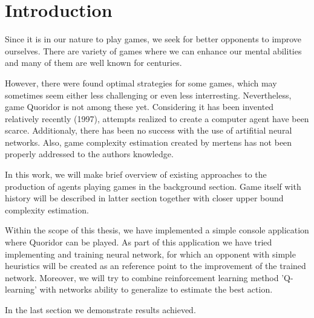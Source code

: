 \chapter{Introduction}\label{chap:1}

Since it is in our nature to play games, we seek for better opponents to
improve ourselves.
There are variety of games where we can enhance our mental abilities and many
of them are well known for centuries.

However, there were found optimal strategies for some games, which may
sometimes seem either less challenging or even less interresting.
Nevertheless, game Quoridor is not among these yet.
Considering it has been invented relatively recently (1997), attempts realized
to create a computer agent have been scarce.
Additionaly, there has been no success with the use of artifitial neural
networks.  Also, game complexity estimation created by mertens has not been
properly addressed to the authors knowledge.

In this work, we will make brief overview of existing approaches to the
production of agents playing games in the background section.
Game itself with history will be described in latter section together with
closer upper bound complexity estimation.

Within the scope of this thesis, we have implemented a simple
console application where Quoridor can be played.
As part of this application we have tried implementing and training neural
network, for which an opponent with simple heuristics will be created as
an reference point to the improvement of the trained network.
Moreover, we will try to combine reinforcement learning method 'Q-learning'
with networks ability to generalize to estimate the best action.

In the last section we demonstrate results achieved.
